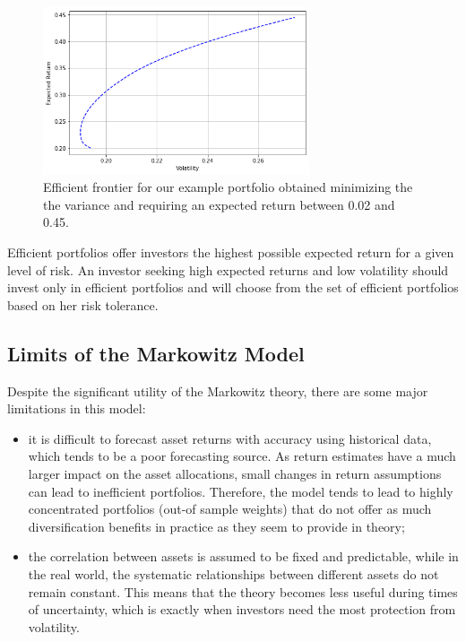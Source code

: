 \begin{figure}[htb]
\centering
\includegraphics[width=0.7\textwidth]{figures/efficient_frontier.png}
\caption{Efficient frontier for our example portfolio obtained minimizing the the variance and requiring an expected return between 0.02 and 0.45.}
\label{fig:efficient_frontier}
\end{figure}

Efficient portfolios offer investors the highest possible expected return for a given level of risk. 
An investor seeking high expected returns and low volatility should invest only in efficient portfolios and will choose from the set of efficient portfolios based on her risk tolerance.
    
\subsection{Limits of the Markowitz Model}
\label{limits-of-the-markowitz-model}
    
Despite the significant utility of the Markowitz theory, there are some major limitations in this model:
    
\begin{itemize}
  	\tightlist
   	\item
   	it is difficult to forecast asset returns with accuracy using
   	historical data, which tends to be a poor forecasting source. As
   	return estimates have a much larger impact on the asset allocations,
   	small changes in return assumptions can lead to inefficient
   	portfolios. Therefore, the model tends to lead to highly concentrated
   	portfolios (out-of sample weights) that do not offer as much
   	diversification benefits in practice as they seem to provide in
   	theory;
   	\item
    the correlation between assets is assumed to be fixed and predictable, while
    in the real world, the systematic relationships between different assets 
    do not remain constant. This means that the theory becomes less useful during 
    times of uncertainty, which is exactly when investors need the most protection 
    from volatility.
    \end{itemize}
    
